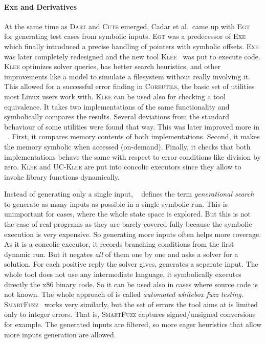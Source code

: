 \paragraph{\textsc{Exe} and Derivatives}
At the same time as \textsc{Dart} and \textsc{Cute} emerged, Cadar et al.\
came up with \textsc{Egt}~\cite{egt} for generating test cases from symbolic
inputs.  \textsc{Egt} was a predecessor of \textsc{Exe}~\cite{exe} which
finally introduced a precise handling of pointers with symbolic offsets.
\textsc{Exe} was later completely redesigned and the new tool
\textsc{Klee}~\cite{klee} was put to execute \llvm code. \textsc{Klee}
optimizes solver queries, has better search heuristics, and other improvements
like a model to simulate a filesystem without really involving it.  This
allowed for a successful error finding in \textsc{Coreutils}, the basic set of
utilities most Linux users work with. \textsc{Klee} can be used also for
checking a tool equivalence. It takes two implementations of the same
functionality and symbolically compares the results. Several deviations from
the standard behaviour of some utilities were found that way. This was later
improved more in \ucklee~\cite{ucklee}. First, it compares memory contents of
both implementations. Second, it makes the memory symbolic when accessed
(on-demand). Finally, it checks that both implementations behave the same with
respect to error conditions like division by zero. \textsc{Klee} and
\textsc{UC-Klee} are put into concolic executors since they allow to invoke
library functions dynamically.

Instead of generating only a single input, \sage~\cite{active_props, sage}
defines the term \emph{generational search} to generate as many inputs as
possible in a single symbolic run. This is unimportant for cases, where the
whole state space is explored. But this is not the case of real programs as
they are barely covered fully because the symbolic execution is very
expensive. So generating more inputs often helps more coverage. As it is a
concolic executor, it records branching conditions from the first dynamic run.
But it negates \emph{all} of them one by one and asks a solver for a solution.
For each positive reply the solver gives, \sage generates a separate input.
The whole tool does not use any intermediate language, it symbolically
executes directly the x86 binary code. So it can be used also in cases where
source code is not known.  The whole approach of \sage is called
\emph{automated whitebox fuzz testing}.  \textsc{SmartFuzz}~\cite{smartfuzz}
works very similarly, but the set of errors the tool aims at is limited only
to integer errors. That is, \textsc{SmartFuzz} captures signed/unsigned
conversions for example. The generated inputs are filtered, so more eager
heuristics that allow more inputs generation are allowed.

